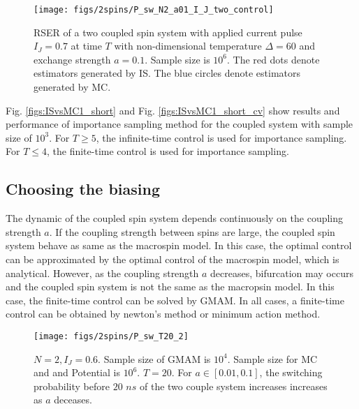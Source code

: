 \documentclass[journal,transmag]{IEEEtran}
\begin{document}
 \begin{figure}[h]
   \centering
         \texttt{[image: figs/2spins/P\_sw\_N2\_a01\_I\_J\_two\_control]}
   \caption{RSER of a two coupled spin system with applied current pulse $I_J = 0.7$ at time $T$ with non-dimensional temperature $\Delta = 60$ and exchange strength $ a = 0.1$. Sample size is $10^6$. The red dots denote estimators generated by IS.  The blue circles denote estimators generated by MC. }
\end{figure}
%
Fig. \ref{figs:ISvsMC1_short} and Fig. \ref{figs:ISvsMC1_short_cv} show results and performance of importance sampling method for the coupled system with sample size of $10^3$. For $T \ge 5$, the infinite-time control is used for importance sampling. For $T \le 4$, the finite-time control is used for importance sampling.
\subsection{Choosing the biasing}
The dynamic of the coupled spin system depends continuously on the coupling strength $a$. If the coupling strength between spins are large, the coupled spin system behave as same as the macrospin model. In this case, the optimal control can be approximated by the optimal control of the macrospin model, which is analytical. However, as the coupling strength $a$ decreases, bifurcation may occurs and the coupled spin system is not the same as the macropsin model. In this case, the finite-time control can be solved by GMAM. In all cases, a finite-time control can be obtained by newton's method or minimum action method.

 \begin{figure}[h]
   \centering
         \texttt{[image: figs/2spins/P\_sw\_T20\_2]}
   \caption{$N = 2, I_J= 0.6$. Sample size of GMAM is $10^4$. Sample size for MC and and Potential  is $10^6$. $T = 20$. For $a \in [0.01, 0.1]$, the switching probability before $20$ $ns$  of the two couple system increases increases as $a$ deceases.}
      \label{figs:ISvsMC3}
\end{figure}
\end{document}
